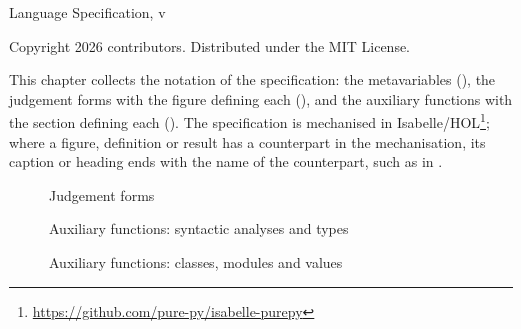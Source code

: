 \documentclass[a4paper,10pt,DIV=12,twoside=false,numbers=noenddot,appendixprefix=true]{scrreprt}
\theoremstyle{plain}
\theoremstyle{definition}
\begin{document}
\begin{titlepage}
\raggedright
\vspace*{50mm}
{\Huge\bfseries \PurePy\par}
\vspace{5mm}
{\LARGE Language Specification, v\versionstring\par}
\vfill
{\small Copyright \textcopyright{} 2026 \PurePy contributors. Distributed under the MIT License.\par}
\end{titlepage}

{\hypersetup{linkcolor=black}\tableofcontents}

\label{ch:summary}

\renewcommand*{\thefigure}{S\arabic{figure}}
\setcounter{figure}{0}

This chapter collects the notation of the specification: the metavariables
(), the judgement forms with the figure defining each
(), and the auxiliary functions with the section defining each
(). The specification is mechanised in
Isabelle/HOL\ifdefined\anonmode\else\footnote{\url{https://github.com/pure-py/isabelle-purepy}}\fi; where a figure,
definition or result has a counterpart in the mechanisation, its caption or heading ends with the name of the
counterpart, such as  in .



\begin{figure}

\caption{Judgement forms}
\label{fig:judgement-index}
\end{figure}

\begin{figure}
\begin{auxindex}
\end{auxindex}
\caption{Auxiliary functions: syntactic analyses and types}
\label{fig:auxiliary-index}
\end{figure}

\begin{figure}
\begin{auxindex}
\end{auxindex}
\caption{Auxiliary functions: classes, modules and values}
\label{fig:auxiliary-index-values}
\end{figure}
\end{document}
